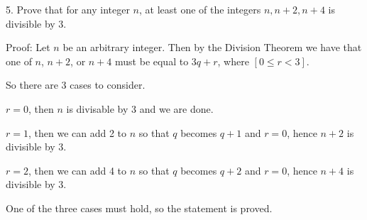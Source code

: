 \documentclass[12pt]{article}
\begin{document}
5. Prove that for any integer $n$, at least one of the integers $n, n+2, n+4$ is divisible by 3.\newline

Proof: Let $n$ be an arbitrary integer. Then by the Division Theorem we have that one of $n$, $n+2$, or $n+4$ must be equal to $3q + r$, where $[0 \leq r < 3]$.\newline

So there are 3 cases to consider.\newline

$r=0$, then $n$ is divisable by 3 and we are done.\newline

$r=1$, then we can add 2 to $n$ so that $q$ becomes $q+1$ and $r=0$, hence $n+2$ is divisible by 3.\newline

$r=2$, then we can add 4 to $n$ so that $q$ becomes $q+2$ and $r=0$, hence $n+4$ is divisible by 3.\newline

One of the three cases must hold, so the statement is proved.
\end{document}
